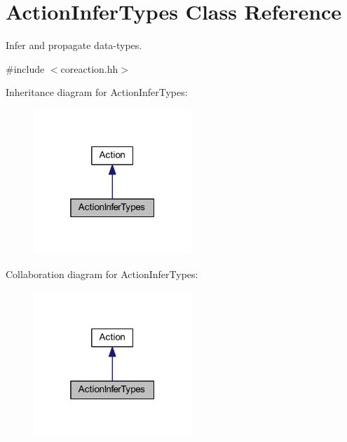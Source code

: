 \hypertarget{class_action_infer_types}{}\section{Action\+Infer\+Types Class Reference}
\label{class_action_infer_types}


Infer and propagate data-\/types.  




{\ttfamily \#include $<$coreaction.\+hh$>$}



Inheritance diagram for Action\+Infer\+Types\+:
\nopagebreak
\begin{figure}[H]
\begin{center}
\leavevmode
\includegraphics[width=169pt]{class_action_infer_types__inherit__graph}
\end{center}
\end{figure}


Collaboration diagram for Action\+Infer\+Types\+:
\nopagebreak
\begin{figure}[H]
\begin{center}
\leavevmode
\includegraphics[width=169pt]{class_action_infer_types__coll__graph}
\end{center}
\end{figure}
